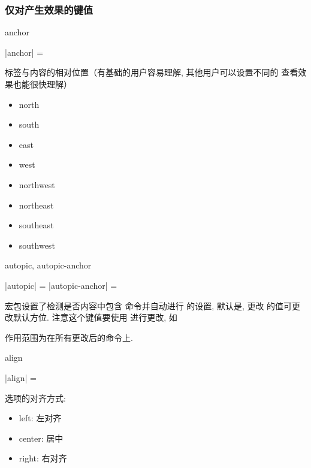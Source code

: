 \documentclass{l3doc}
\begin{document}
\begin{documentation}
\subsubsection{仅对产生效果的键值}
\begin{function}[updated = 2021-12-23]{anchor}
  \begin{syntax}
    |anchor| =  
  \end{syntax}
  标签与内容的相对位置（有基础的用户容易理解, 其他用户可以设置不同的  查看效果也能很快理解）
  \begin{itemize}
    \item north
    \item south
    \item east
    \item west
    \item northwest
    \item northeast
    \item southeast
    \item southwest
  \end{itemize}
\end{function}


\begin{function}[added = 2021-12-25]{autopic, autopic-anchor}
  \begin{syntax}
    |autopic| =   
    |autopic-anchor| =  
  \end{syntax}
   宏包设置了检测是否内容中包含  命令并自动进行  的设置, 默认是, 更改  的值可更改默认方位.
  注意这个键值要使用  进行更改, 如
  \lstset{ linewidth = 0.4\linewidth }
  \begin{LaTeXdemo}
  \end{LaTeXdemo}
  作用范围为在所有更改后的命令上.
\end{function}
\begin{function}{align}
  \begin{syntax}
    |align| =  
  \end{syntax}
  选项的对齐方式:
  \begin{itemize}
    \item left: 左对齐
    \item center: 居中
    \item right: 右对齐
  \end{itemize}
\end{function}



\end{documentation}
\end{document}

